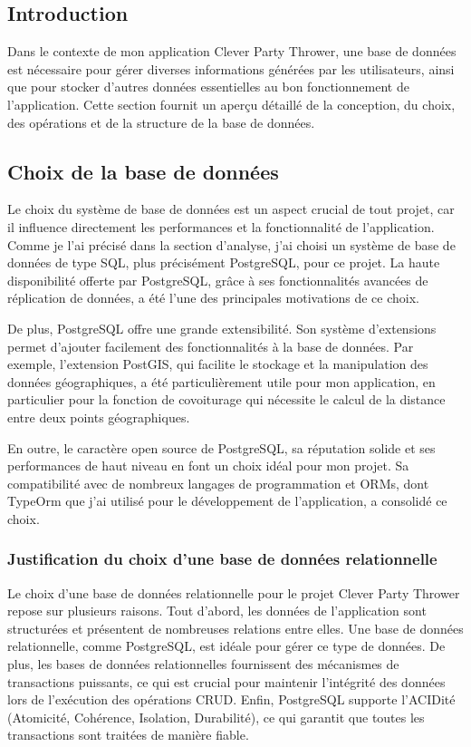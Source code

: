 \subsection{Introduction}\label{subsec:introduction_base_de_donnee}
Dans le contexte de mon application Clever Party Thrower, une base de données est nécessaire pour gérer diverses informations générées par les utilisateurs,
ainsi que pour stocker d'autres données essentielles au bon fonctionnement de l'application.
Cette section fournit un aperçu détaillé de la conception, du choix, des opérations et de la structure de la base de données.

\subsection{Choix de la base de données}\label{subsec:choix-de-la-base-de-donnee}
Le choix du système de base de données est un aspect crucial de tout projet, car il influence directement les performances et la fonctionnalité de l'application.
Comme je l'ai précisé dans la section d'analyse, j'ai choisi un système de base de données de type SQL, plus précisément PostgreSQL, pour ce projet.
La haute disponibilité offerte par PostgreSQL, grâce à ses fonctionnalités avancées de réplication de données, a été l'une des principales motivations de ce choix.

De plus, PostgreSQL offre une grande extensibilité.
Son système d'extensions permet d'ajouter facilement des fonctionnalités à la base de données.
Par exemple, l'extension PostGIS, qui facilite le stockage et la manipulation des données géographiques, a été particulièrement utile pour mon application,
en particulier pour la fonction de covoiturage qui nécessite le calcul de la distance entre deux points géographiques.

En outre, le caractère open source de PostgreSQL, sa réputation solide et ses performances de haut niveau en font un choix idéal pour mon projet.
Sa compatibilité avec de nombreux langages de programmation et ORMs, dont TypeOrm que j'ai utilisé pour le développement de l'application, a consolidé ce choix.

\subsubsection{Justification du choix d'une base de données relationnelle}\label{subsec:justification-choix-relational-db}
Le choix d'une base de données relationnelle pour le projet Clever Party Thrower repose sur plusieurs raisons.
Tout d'abord, les données de l'application sont structurées et présentent de nombreuses relations entre elles.
Une base de données relationnelle, comme PostgreSQL, est idéale pour gérer ce type de données.
De plus, les bases de données relationnelles fournissent des mécanismes de transactions puissants, ce qui est crucial pour maintenir
l'intégrité des données lors de l'exécution des opérations CRUD. Enfin,
PostgreSQL supporte l'ACIDité (Atomicité, Cohérence, Isolation, Durabilité), ce qui garantit que toutes les transactions sont traitées de manière fiable.

